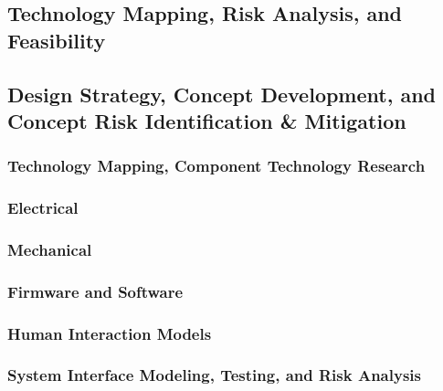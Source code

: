 \documentclass[a4paper, 10pt]{article}
\begin{document}
	\subsection{Technology Mapping, Risk Analysis, and Feasibility}
	\subsection{Design Strategy, Concept Development, and Concept Risk Identification \& Mitigation}
		\subsubsection{Technology Mapping, Component Technology Research}
		\subsubsection{Electrical}
		\subsubsection{Mechanical}
		\subsubsection{Firmware and Software}
		\subsubsection{Human Interaction Models}
		\subsubsection{System Interface Modeling, Testing, and Risk Analysis}

	
\end{document}
